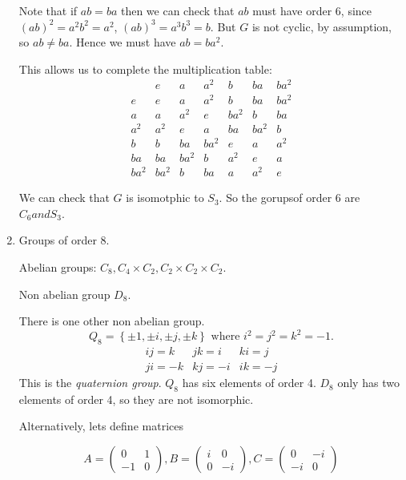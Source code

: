 \documentclass{article}
\theoremstyle{definition}
\begin{document}
\begin{enumerate}
Note that if $ab=ba$ then we can check that $ab$ must have order 6, 
since $(ab)^2=a^2b^2=a^2$, $(ab)^3=a^3b^3=b.$ But $G$ is not cyclic, by assumption, so $ab\neq ba$.
Hence we must have $ab = ba^2$.

This allows us to complete the multiplication table:
\begin{equation}
  \begin{matrix}
     & e & a & a^2 & b & ba & ba^2 \\
   e & e & a & a^2 & b & ba & ba^2 \\
   a & a & a^2 & e & ba^2 & b & ba \\
   a^2 & a^2 & e & a & ba & ba^2 & b \\
   b & b & ba & ba^2 & e & a & a^2               \\
   ba & ba & ba^2 & b & a^2 & e & a            \\
   ba^2 & ba^2 & b & ba & a & a^2 & e
 \end{matrix}
\end{equation}

We can check that  $G$ is isomotphic to $S_3$. So the gorupsof order 6 are $C_6 and S_3$.

\item Groups of order 8.

  Abelian groups: $C_8,C_4\times C_2, C_2 \times C_2 \times C_2.$ 

  Non abelian group $D_8$.

  There is one other non abelian group.
  \begin{equation}
    Q_8 = \left\{ \pm1, \pm i, \pm j, \pm k \right\} \text{ where } i^2=j^2=k^2=-1.
    \label{}
  \end{equation}
  \begin{equation}
    \begin{matrix}
      ij=k & jk=i & ki=j \\
      ji=-k & kj=-i & ik=-j
    \end{matrix}
    \label{}
  \end{equation}
  This is the \emph{quaternion group}. 
  $Q_8$ has six elements of order 4. 
  $D_8$ only has two elements of order 4, so they are not isomorphic.

  Alternatively, lets define matrices

  \begin{equation}
    A = \left( 
\begin{matrix}
  0 & 1 \\
  -1 & 0
\end{matrix} 
    \right),
   B = \left( 
   \begin{matrix}
     i & 0 \\
     0 & -i
   \end{matrix}
   \right),
   C = 
   \left( 
\begin{matrix}
  0 & -i \\
  -i & 0
\end{matrix}
   \right)
    \label{}
  \end{equation}


\end{enumerate}
\end{document}
